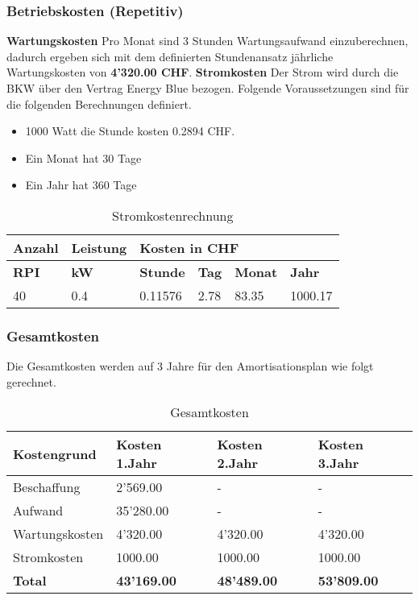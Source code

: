 \subsubsection{Betriebskosten (Repetitiv)}

\textbf{Wartungskosten}
\newline
Pro Monat sind 3 Stunden Wartungsaufwand einzuberechnen, dadurch ergeben sich mit dem definierten Stundenansatz jährliche Wartungskosten von \textbf{4'320.00 CHF}. \newline
\newline
\textbf{Stromkosten}
Der Strom wird durch die BKW über den Vertrag Energy Blue bezogen.
Folgende Voraussetzungen sind für die folgenden Berechnungen definiert.
\begin{itemize}
	\item 1000 Watt die Stunde kosten 0.2894 CHF.
	\item Ein Monat hat 30 Tage
	\item Ein Jahr hat 360 Tage
\end{itemize}
\begin{table}[H]
\centering
\begin{tabular}{p{1.5cm}p{2cm}|p{2.75cm}p{2.75cm}p{2.75cm}p{2.75cm}}
\hline
\rowcolor{heading} \textbf{Anzahl} & \textbf{Leistung} & \multicolumn{4}{l}{\textbf{Kosten in CHF}} \\\hline
\rowcolor{subheading} \textbf{RPI} & \textbf{kW} & \textbf{Stunde} &\textbf{Tag} & \textbf{Monat} &\textbf{Jahr} \\\hline
40 & 0.4 & 0.11576 & 2.78 & 83.35 & 1000.17 \\\hline
\end{tabular}
\caption{Stromkostenrechnung}
\end{table}

\subsubsection{Gesamtkosten}
Die Gesamtkosten werden auf 3 Jahre für den Amortisationsplan wie folgt gerechnet.
\begin{table}[H]
\centering
\begin{tabular}{p{4cm}p{4cm}p{4cm}p{4cm}}
\hline
\rowcolor{heading} \textbf{Kostengrund} & \textbf{Kosten 1.Jahr} & \textbf{Kosten 2.Jahr} & \textbf{Kosten 3.Jahr}\\\hline
Beschaffung & 2'569.00 & - & - \\\hline
Aufwand & 35'280.00 & - & - \\\hline
Wartungskosten & 4'320.00 & 4'320.00 & 4'320.00 \\\hline
Stromkosten & 1000.00 & 1000.00 & 1000.00 \\\hline
\rowcolor{subheading}\textbf{Total} & \textbf{43'169.00} & \textbf{48'489.00} & \textbf{53'809.00} \\\hline
\end{tabular}
\caption{Gesamtkosten}
\end{table}

